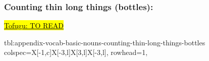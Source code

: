 \documentclass[../nihongo-gakushuu-kyouzai.tex]{subfiles}
\begin{document}
\subsubsection{Counting thin long things (bottles): }
\href{https://www.tofugu.com/japanese/japanese-counter-hon/}{\hl{Tofugu: TO READ}}

{tbl:appendix-vocab-basic-nouns-counting-thin-long-things-bottles}  %
{
    colspec={X[-1,c]X[-3,l]X[3,l]X[-3,l]},
    rowhead=1,
}  %
\end{document}
